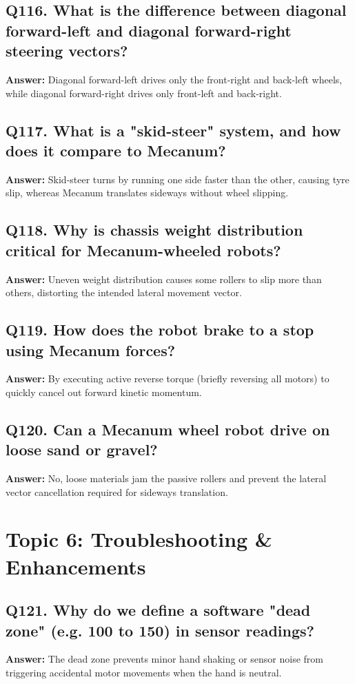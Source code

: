 \documentclass[12pt,a4paper,oneside]{report}
\begin{document}
\section{Q116. What is the difference between diagonal forward-left and diagonal forward-right steering vectors?}
\textbf{Answer:} Diagonal forward-left drives only the front-right and back-left wheels, while diagonal forward-right drives only front-left and back-right.

\section{Q117. What is a "skid-steer" system, and how does it compare to Mecanum?}
\textbf{Answer:} Skid-steer turns by running one side faster than the other, causing tyre slip, whereas Mecanum translates sideways without wheel slipping.

\section{Q118. Why is chassis weight distribution critical for Mecanum-wheeled robots?}
\textbf{Answer:} Uneven weight distribution causes some rollers to slip more than others, distorting the intended lateral movement vector.

\section{Q119. How does the robot brake to a stop using Mecanum forces?}
\textbf{Answer:} By executing active reverse torque (briefly reversing all motors) to quickly cancel out forward kinetic momentum.

\section{Q120. Can a Mecanum wheel robot drive on loose sand or gravel?}
\textbf{Answer:} No, loose materials jam the passive rollers and prevent the lateral vector cancellation required for sideways translation.

\chapter{Topic 6: Troubleshooting \& Enhancements}

\section{Q121. Why do we define a software "dead zone" (e.g. 100 to 150) in sensor readings?}
\textbf{Answer:} The dead zone prevents minor hand shaking or sensor noise from triggering accidental motor movements when the hand is neutral.
\end{document}
